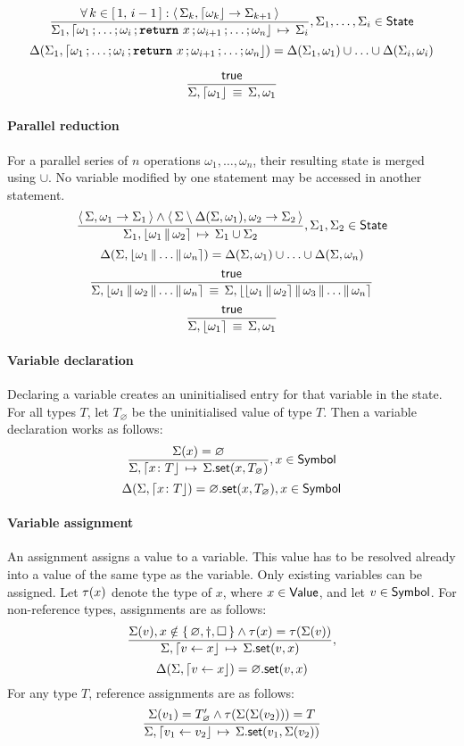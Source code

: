$$
\semrule{
	\forall\, k \in \range{1}{i-1}: \results{\Sigma_k}{\stmt{\omega_k}}{\Sigma_{k+1}}}
	{\Sigma_1, \stmt{\omega_1}{\ldots}{\omega_i}{\retstmt{x}}{\omega_{i+1}}{\ldots}{\omega_n}}
	{\Sigma_i},
	\Sigma_1, \ldots, \Sigma_i \in \State
$$
$$
	\Delta(\Sigma_1, \stmt{\omega_1}{\ldots}{\omega_i}{\retstmt{x}}{\omega_{i+1}}{\ldots}{\omega_n}) =
		\Delta(\Sigma_1, \omega_1) \cup \ldots \cup \Delta(\Sigma_i, \omega_i)
$$

$$
\semruleeq{\true}
	{\Sigma, \stmt{\omega_1}}
	{\Sigma, \omega_1}
$$

\paragraph{Parallel reduction}
For a parallel series of $n$ operations $\omega_1, \ldots, \omega_n$, their resulting state is merged using $\cup$.
No variable modified by one statement may be accessed in another statement.
$$
	\semrule{
		\results{\Sigma}{\omega_1}{\Sigma_1} \land
		\results{\Sigma \setminus \Delta(\Sigma, \omega_1)}{\omega_2}{\Sigma_2}}
		{\Sigma_1, \parstmt{\omega_1}{\omega_2}}
		{\Sigma_1 \cup \Sigma_2},
			\Sigma_1, \Sigma_2 \in \State
$$
$$
	\Delta(\Sigma, \parstmt{\omega_1}{\ldots}{\omega_n}) = \Delta(\Sigma, \omega_1) \cup \ldots \cup \Delta(\Sigma, \omega_n)
$$
$$
	\semruleeq{\true}
		{\Sigma, \parstmt{\omega_1}{\omega_2}{\ldots}{\omega_n}}
		{\Sigma, \parstmt{\parstmt{\omega_1}{\omega_2}}{\omega_3}{\ldots}{\omega_n}}
$$
$$
\semruleeq{\true}
	{\Sigma, \parstmt{\omega_1}}
	{\Sigma, \omega_1}
$$

\paragraph{Variable declaration}
Declaring a variable creates an uninitialised entry for that variable in the state.
For all types $T$, let $T_\varnothing$ be the uninitialised value of type $T$.
Then a variable declaration works as follows:
$$
\semrule
	{\Sigma(x) = \varnothing}
	{\Sigma, \stmt{\varv{x}{T}}}
	{\StSet{\Sigma}{x}{T_\varnothing}},
		x \in \Symbol
$$
$$
\Delta(\Sigma, \stmt{\varv{x}{T}}) = \StSet{\varnothing}{x}{T_\varnothing},
                x \in \Symbol
$$

\paragraph{Variable assignment}
An assignment assigns a value to a variable.
This value has to be resolved already into a value of the same type as the variable.
Only existing variables can be assigned.
Let $\tau(x)$ denote the type of $x$, where $x \in \mathsf{Value}$, and let $v \in \mathsf{Symbol}$.
For non-reference types, assignments are as follows:
$$
\semrule
	{\Sigma(v), x \notin \set{\varnothing, \dagger, \Box} \land
		\typeof{x} = \typeof{\Sigma(v)}}
	{\Sigma, \stmt{v \gets x}}
	{\StSet{\Sigma}{v}{x}},
$$
$$
\Delta(\Sigma, \stmt{v \gets x}) = \StSet{\varnothing}{v}{x}
$$
For any type $T$, reference assignments are as follows:
$$
\semrule
	{\Sigma(v_1) = \reft{T}_\varnothing \land
		\typeof{\Sigma(\Sigma(v_2))} = T}
	{\Sigma, \stmt{v_1 \gets v_2}}
	{\StSet{\Sigma}{v_1}{\Sigma(v_2)}}
$$


